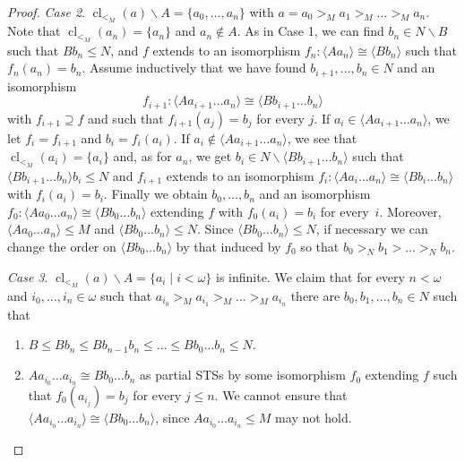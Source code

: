 \documentclass[a4paper, 11pt]{article}
\DeclareMathOperator{\cl}{cl}
\theoremstyle{note}
\begin{document}
\begin{proof}
	\emph{Case 2}.  $\cl_{<_M}(a)\smallsetminus A=\{a_0,\ldots,a_n\}$  with  $a=a_0>_M a_1 >_M \ldots >_M a_n$.  Note that  $\cl_{<_M}(a_n)=\{a_n\}$  and $a_n\not\in A$. As in Case 1, we can find $b_n\in N\smallsetminus B$ such that $Bb_n\leq N$, and $f$ extends to an isomorphism $f_n:\langle Aa_n\rangle\cong \langle Bb_n\rangle$ such that $f_n(a_n)=b_n$.  Assume inductively that we have found $b_{i+1},\ldots,b_n\in N$ and an isomorphism 
	$$f_{i+1}:\langle Aa_{i+1}\ldots a_n\rangle \cong \langle B b_{i+1}\ldots b_n\rangle$$
	with $f_{i+1}\supseteq f$ and such that  $f_{i+1}(a_j)= b_j$  for every $j$.  If $a_i\in \langle Aa_{i+1}\ldots a_n\rangle$, we let $f_i=f_{i+1}$ and $b_i= f_i(a_i)$.  If $a_i\not \in \langle Aa_{i+1}\ldots a_n\rangle$, we see that $\cl_{<_M}(a_i)= \{a_i\}$ and, as for $a_n$, we get $b_i\in N\smallsetminus  \langle Bb_{i+1}\ldots b_n\rangle$ such that $ \langle Bb_{i+1}\ldots b_n\rangle b_i\leq N$ and $f_{i+1}$ extends to an isomorphism  $f_i:\langle Aa_i\ldots a_n\rangle\cong \langle B b_i\ldots b_n\rangle$ with $f_i(a_i)=b_i$. Finally  we obtain $b_0,\ldots,b_n$  and an isomorphism $f_0:\langle Aa_0\ldots a_n\rangle \cong \langle Bb_0\ldots b_n\rangle$ extending $f$   with $f_0(a_i)=b_i$ for every~$i$. Moreover, $\langle Aa_0\ldots a_n\rangle\leq M$ and   $\langle Bb_0\ldots b_n\rangle\leq N$.  Since $ \langle B b_0\ldots b_n\rangle \leq N$, if necessary we can change the  order on $\langle Bb_0\ldots b_n\rangle$ by that induced by $f_0$ so that $b_0>_Nb_1>\ldots  >_N b_n$.
	
 \emph{Case 3}.  $\cl_{<_M}(a)\smallsetminus A= \{a_i\mid i<\omega\}$ is infinite.   We claim that   for every $n<\omega$ and $i_0,\ldots,i_n\in\omega$ such that $a_{i_0}>_M a_{i_1}>_M\ldots >_M a_{i_n}$ there are $b_0,b_1,\ldots, b_n\in N$  such  that
	\begin{enumerate}
		\item $B\leq Bb_n\leq Bb_{n-1}b_n\leq \ldots \leq  Bb_0\ldots b_n \leq N$.
		\item $ Aa_{i_0}\ldots a_{i_n}\cong Bb_0\ldots b_n$ as partial STSs by some isomorphism  $f_0$ extending $f$  such that $f_0(a_{i_j})=b_j$  for every  $j\leq n$.
		We cannot ensure that $\langle Aa_{i_0}\ldots a_{i_n}\rangle\cong \langle Bb_0\ldots b_n\rangle $, since $Aa_{i_0}\ldots a_{i_n}\leq M$ may not hold.
	\end{enumerate}
	

\end{proof}
\end{document}
